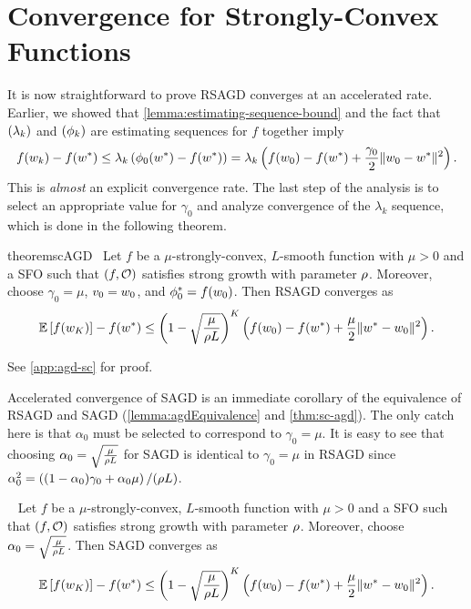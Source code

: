 \section{Convergence for Strongly-Convex Functions}\label{sec:agd-sc}

It is now straightforward to prove \ac{RSAGD} converges at an accelerated rate. 
Earlier, we showed that \autoref{lemma:estimating-sequence-bound} and the fact that \( \seq{\lambda_k} \) and \( \seq{\phi_k} \) are estimating sequences for \( f \) together imply
\[ f(\wk) - f(\wopt) \leq \lambda_k \rbr{\phi_0(\wopt) - f(\wopt)} = \lambda_k \rbr{f(\w_0) - f(\wopt) + \frac{\gamma_0}{2} \norm{\w_0 - \wopt}^2}. \]
This is \emph{almost} an explicit convergence rate. 
The last step of the analysis is to select an appropriate value for \( \gamma_0 \) and analyze convergence of the \( \lambda_k \) sequence, which is done in the following theorem.

\begin{restatable}{theorem}{scAGD}~\label{thm:sc-agd}
    Let \( f \) be a \( \mu \)-strongly-convex, \( L \)-smooth function with \( \mu > 0 \) and \oracle{} a \ac{SFO} such that \( \rbr{f, \oracle{}} \) satisfies strong growth with parameter \( \sgc \).
    Moreover, choose \( \gamma_0 = \mu \), \( v_0 = \w_0 \), and \( \phi_0^* = f(\w_0) \).
    Then \ac{RSAGD} converges as  
    \[ \E\sbr{f(\w_K)} - f(\wopt) \leq \rbr{1 - \sqrt{\frac{\mu}{\sgc L}}}^{K} \rbr{ f(w_0) - f(\wopt) + \frac{\mu}{2} \norm{\wopt - \w_0}^2 }.  \]
\end{restatable}
\noindent See \autoref{app:agd-sc} for proof.\hfill \break

Accelerated convergence of \ac{SAGD} is an immediate corollary of the equivalence of \ac{RSAGD} and \ac{SAGD} (\autoref{lemma:agdEquivalence} and \autoref{thm:sc-agd}).
The only catch here is that \( \alpha_0 \) must be selected to correspond to \( \gamma_0 = \mu \).
It is easy to see that choosing \( \alpha_0 = \sqrt{\frac{\mu}{\sgc L}} \) for \ac{SAGD} is identical to \( \gamma_0 = \mu \) in \ac{RSAGD} since \( \alpha_0^2 = \rbr{(1 - \alpha_0)\gamma_0 + \alpha_0 \mu} / (\sgc L) \).

\begin{corollary}~\label{cor:sc-agd}
    Let \( f \) be a \( \mu \)-strongly-convex, \( L \)-smooth function with \( \mu > 0 \) and \oracle{} a \ac{SFO} such that \( \rbr{f, \oracle{}} \) satisfies strong growth with parameter \( \sgc \).
    Moreover, choose \( \alpha_0 = \sqrt{\frac{\mu}{\sgc L}} \). 
    Then \ac{SAGD} converges as  
    \[ \E\sbr{f(\w_K)} - f(\wopt) \leq \rbr{1 - \sqrt{\frac{\mu}{\sgc L}}}^{K} \rbr{ f(w_0) - f(\wopt) + \frac{\mu}{2} \norm{\wopt - \w_0}^2 }.  \]
\end{corollary}

